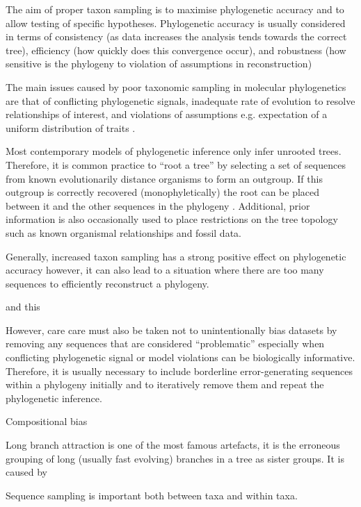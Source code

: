 The aim of proper taxon sampling is to maximise phylogenetic accuracy and to allow
testing of specific hypotheses. 
Phylogenetic accuracy is usually considered in terms of consistency (as data increases 
    the analysis tends towards the correct tree), efficiency (how quickly does this convergence
occur), and robustness (how sensitive is the phylogeny to violation of assumptions in reconstruction) \citep{Nabhan2012}

The main issues caused by poor taxonomic sampling in molecular phylogenetics are that
of conflicting phylogenetic signals, inadequate rate of evolution to resolve relationships
of interest, and violations of assumptions e.g. expectation of a uniform distribution of traits \citep{Nabhan2012}.



Most contemporary models of phylogenetic inference only infer unrooted trees. 
Therefore, it is common practice to ``root a tree'' by selecting a set of sequences from known evolutionarily distance
organisms to form an outgroup. If this outgroup is correctly recovered (monophyletically) the root can be placed between
it and the other sequences in the phylogeny \citep{Yang2012}.  Additional, prior information is also occasionally used
to place restrictions on the tree topology such as known organismal relationships and fossil data.




Generally, increased taxon sampling has a strong positive effect on phylogenetic accuracy \citep{Zwickl2002}
however, it can also lead to a situation where there are too many sequences to efficiently
reconstruct a phylogeny.


and this 

However, care care must also be taken not to unintentionally bias datasets by removing 
any sequences that are considered ``problematic'' especially when conflicting phylogenetic signal
or model violations can be biologically informative.  Therefore, it is usually necessary to include
borderline error-generating sequences within a phylogeny initially and to iteratively remove them
and repeat the phylogenetic inference.


Compositional bias 


Long branch attraction is one of the most famous artefacts, it is the erroneous grouping of long (usually fast evolving)
branches in a tree as sister groups.  It is caused by 


Sequence sampling is important both between taxa and within taxa.

